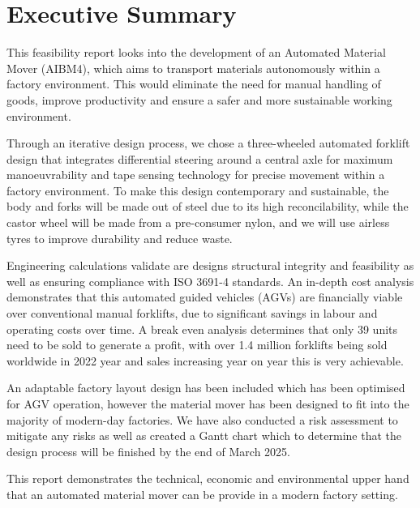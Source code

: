 \documentclass[12pt]{article}
\begin{document}
\tableofcontents

\newpage



\section{Executive Summary}
This feasibility report looks into the development of an Automated Material Mover (AIBM4), which aims to transport materials autonomously within a factory environment. This would eliminate the need for manual handling of goods, improve productivity and ensure a safer and more sustainable working environment. 
\par Through an iterative design process, we chose a three-wheeled automated forklift design that integrates differential steering around a central axle for maximum manoeuvrability and tape sensing technology for precise movement within a factory environment. To make this design contemporary and sustainable, the body and forks will be made out of steel due to its high reconcilability, while the castor wheel will be made from a pre-consumer nylon, and we will use airless tyres to improve durability and reduce waste.
\par Engineering calculations validate are designs structural integrity and feasibility as well as ensuring compliance with ISO 3691-4  standards. An in-depth cost analysis demonstrates that this automated guided vehicles (AGVs) are financially viable over conventional manual forklifts, due to significant savings in labour and operating costs over time. A break even analysis determines that only 39 units need to be sold to generate a profit, with over 1.4 million forklifts\cite{Statista} being sold worldwide in 2022 year and sales increasing year on year this is very achievable.
\par An adaptable factory layout design has been included which has been optimised for AGV operation, however the material mover has been designed to fit into the majority of modern-day factories. We have also conducted a risk assessment to mitigate any risks as well as created a Gantt chart which to determine that the design process will be finished by the end of March 2025.
\par This report demonstrates the technical, economic and environmental upper hand that an automated material mover can be provide in a modern factory setting.
\end{document}
